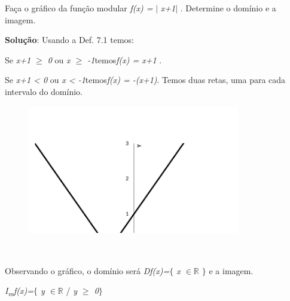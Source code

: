 \begin{texemplo}

Faça o gráfico da função modular \textit{f(x) =} $ \vert $ \textit{x+1}$ \vert $ . Determine o domínio e a imagem.  

\textbf{Solução}: Usando a Def. 7.1 temos:

\quad Se \textit{x+1 $ \geq $  0} ou \textit{x $ \geq $ -1}temos\textit{f(x) = x+1 }.

\quad Se \textit{x+1 < 0} ou \textit{ x < -1}temos\textit{f(x) = -(x+1)}. Temos duas retas, uma para cada intervalo do domínio.

\begin{figure}[H]
	\begin{Center}
		\includegraphics[width=3.65in,height=2.23in]{capitulos/outras_funcoes/media/image31.pdf}
	\end{Center}
\end{figure}

~~

\quad Observando o gráfico, o domínio será   \textit{Df(x)=$ \{ $ x $ \in \mathbb{R} $  \textbf{ }$ \} $ } e a imagem.

\quad \textit{I\textsubscript{m}f(x)=$ \{ $ y $ \in \mathbb{R} $  }/ \textit{y $ \geq $  0$ \} $ } \qedsymbol{}
\end{texemplo}

